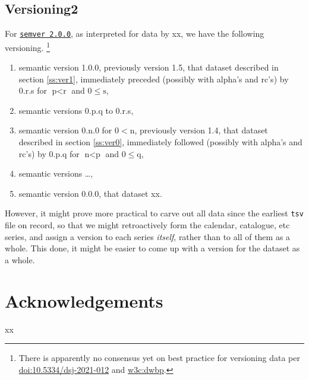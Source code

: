 \documentclass{amsart}%
\newcommand{\code}[1]{\texttt{#1}}%
\theoremstyle{plain}
\theoremstyle{definition}
\theoremstyle{remark}
\theoremstyle{definition}
\theoremstyle{remark}
\begin{document}
\subsection{Versioning2}
\label{ss:versioning2}
For \href{https://semver.org}{\code{semver 2.0.0}}, as interpreted for data by xx, we have the following versioning.%
\footnote{There is apparently no consensus yet on best practice for versioning data per \href{http://doi.org/10.5334/dsj-2021-012}{doi:10.5334/dsj-2021-012} and \href{https://www.w3.org/TR/dwbp/}{w3c:dwbp}.}%
\begin{enumerate}
\item semantic version 1.0.0, previously version 1.5, that dataset described in section \ref{ss:ver1}, immediately preceded (possibly with alpha's and rc's) by 0.r.s for \(\text{p}<\text{r}\) and \(0\leq\text{s}\),
\item semantic versions 0.p.q to 0.r.s,
\item semantic version 0.n.0 for \(0<\text{n}\), %
previously version 1.4, that dataset described in section \ref{ss:ver0}, immediately followed (possibly with alpha's and rc's) by 0.p.q for \(\text{n}<\text{p}\) and \(0\leq\text{q}\),
\item semantic versions \ldots,
\item semantic version 0.0.0, that dataset xx.%
\end{enumerate}
However, it might prove more practical to carve out all data since the earliest \code{tsv} file on record, so that we might retroactively form the calendar, catalogue, etc series, and assign a version to each series \emph{itself}, rather than to all of them as a whole. This done, it might be easier to come up with a version for the dataset as a whole.%
%
%
%
%
%
\section*{Acknowledgements}
\label{s:acknow}
xx
%
%
%
%
%
%
%
%
%
\end{document}
